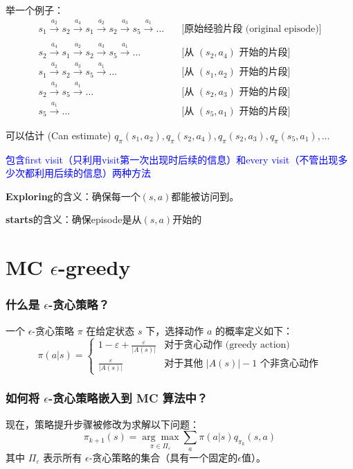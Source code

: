 \documentclass{article}
\begin{document}
举一个例子：
\begin{align*}
    s_1 \xrightarrow{a_2} s_2 \xrightarrow{a_4} s_1 \xrightarrow{a_2} s_2 \xrightarrow{a_3} s_5 \xrightarrow{a_1} \dots \quad &\text{[原始经验片段 (original episode)]} \\
    \\
    s_2 \xrightarrow{a_4} s_1 \xrightarrow{a_2} s_2 \xrightarrow{a_3} s_5 \xrightarrow{a_1} \dots \quad &\text{[从 $(s_2, a_4)$ 开始的片段]} \\
    s_1 \xrightarrow{a_2} s_2 \xrightarrow{a_3} s_5 \xrightarrow{a_1} \dots \quad &\text{[从 $(s_1, a_2)$ 开始的片段]} \\
    s_2 \xrightarrow{a_3} s_5 \xrightarrow{a_1} \dots \quad &\text{[从 $(s_2, a_3)$ 开始的片段]} \\
    s_5 \xrightarrow{a_1} \dots \quad &\text{[从 $(s_5, a_1)$ 开始的片段]}
\end{align*}

可以估计 (Can estimate) $q_{\pi}(s_1, a_2), q_{\pi}(s_2, a_4), q_{\pi}(s_2, a_3), q_{\pi}(s_5, a_1), \dots$

\textcolor{blue}{\kaishu*包含first visit（只利用visit第一次出现时后续的信息）和every visit（不管出现多少次都利用后续的信息）两种方法}

\textbf{Exploring}的含义：确保每一个$(s,a)$都能被访问到。

\textbf{starts}的含义：确保episode是从$(s,a)$开始的
\section{MC $\epsilon$-greedy}
\subsubsection*{什么是 $\epsilon$-贪心策略？}
一个 $\epsilon$-贪心策略 $\pi$ 在给定状态 $s$ 下，选择动作 $a$ 的概率定义如下：
\[
\pi(a|s) =
\begin{cases}
  1 - \varepsilon + \frac{\varepsilon}{|A(s)|} & \text{对于贪心动作 (greedy action)} \\
  \frac{\varepsilon}{|A(s)|} & \text{对于其他 } |A(s)| - 1 \text{ 个非贪心动作}
\end{cases}
\]

\subsubsection*{如何将 $\epsilon$-贪心策略嵌入到 MC 算法中？}
现在，策略提升步骤被修改为求解以下问题：
\[
\pi_{k+1}(s) = \underset{\pi \in \Pi_{\varepsilon}}{\arg\max} \sum_{a} \pi(a|s) q_{\pi_k}(s, a)
\]
其中 $\Pi_{\varepsilon}$ 表示所有 $\epsilon$-贪心策略的集合（具有一个固定的$\epsilon$值）。
\end{document}

